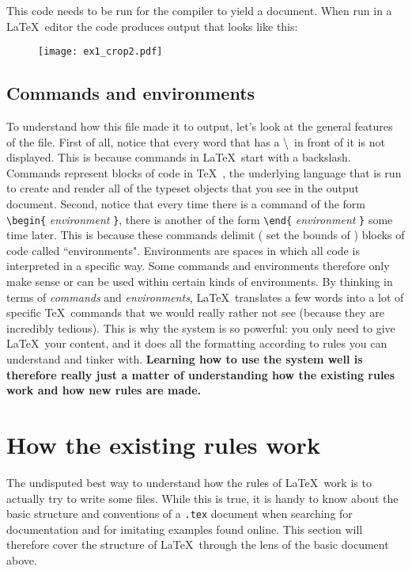This code needs to be run for the compiler to yield a document. When run in a \LaTeX\ editor the code produces output that looks like this:

\begin{figure}[H]
\centering
\texttt{[image: ex1\_crop2.pdf]}
\end{figure}
\subsection{Commands and environments}
To understand how this file made it to output, let's look at the general features of the file. First of all, notice that  every word that has a \textbackslash\ in front of it is not displayed. This is because commands in \LaTeX\ start with a backslash. Commands represent blocks of code in \TeX\ , the underlying language that is run to create and render all of the typeset objects that you see in the output document.
Second, notice that every time there is a command of the form \verb|\begin{|  {\it environment} \verb|}|, there is another of the form \verb|\end{| {\it environment} \verb|}| some time later. This is because these commands delimit ( set the bounds of ) blocks of code called ``environments". Environments are spaces in which all code is interpreted in a specific way. Some commands and environments therefore only make sense or can be used within certain kinds of environments. By thinking in terms of {\it commands} and {\it environments}, \LaTeX\ translates a few words into a lot of specific \TeX\ commands that we would really rather not see (because they are incredibly tedious). This is why the system is so powerful: you only need to give \LaTeX\ your content, and it does all the formatting according to rules you can understand and tinker with. {\bf Learning how to use the system well is therefore really just a matter of understanding how the existing rules work and how new rules are made.}



\section{How the existing rules work}

The undisputed best way to understand how the rules of \LaTeX\ work is to actually try to write some files. While this is true, it is handy to know about the basic structure and conventions of a \texttt{.tex} document when searching for documentation and for imitating examples found online. This section will therefore cover the structure of \LaTeX\ through the lens of the basic document above.

